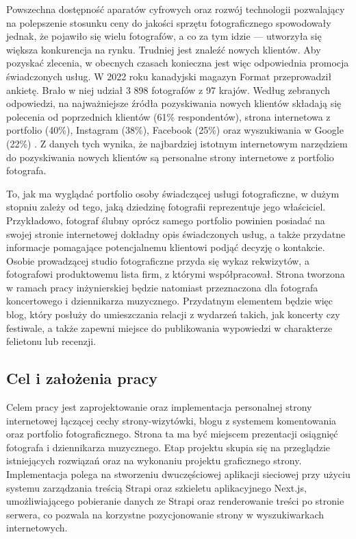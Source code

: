 \documentclass[a4paper, 12pt, twoside]{article}
\numberwithin{figure}{section}
\begin{document}
\begin{sloppypar}
Powszechna dostępność aparatów cyfrowych oraz rozwój technologii pozwalający na polepszenie stosunku ceny do jakości sprzętu fotograficznego spowodowały jednak, że pojawiło się wielu fotografów, a co za tym idzie --- utworzyła się większa konkurencja na rynku. Trudniej jest znaleźć nowych klientów. Aby pozyskać zlecenia, w obecnych czasach konieczna jest więc odpowiednia promocja świadczonych usług. W 2022 roku kanadyjski magazyn Format przeprowadził ankietę. Brało w niej udział 3 898 fotografów z 97 krajów. Według zebranych odpowiedzi, na najważniejsze źródła pozyskiwania nowych klientów składają się polecenia od poprzednich klientów (61\% respondentów), strona internetowa z portfolio (40\%), Instagram (38\%), Facebook (25\%) oraz wyszukiwania w Google (22\%) \cite{stateofphotography}. Z danych tych wynika, że najbardziej istotnym internetowym narzędziem do pozyskiwania nowych klientów są personalne strony internetowe z portfolio fotografa.

To, jak ma wyglądać portfolio osoby świadczącej usługi fotograficzne, w dużym stopniu zależy od tego, jaką dziedzinę fotografii reprezentuje jego właściciel. Przykładowo, fotograf ślubny oprócz samego portfolio powinien posiadać na swojej stronie internetowej dokładny opis świadczonych usług, a także przydatne informacje pomagające potencjalnemu klientowi podjąć decyzję o kontakcie. Osobie prowadzącej studio fotograficzne przyda się wykaz rekwizytów, a fotografowi produktowemu lista firm, z którymi współpracował. Strona tworzona w ramach pracy inżynierskiej będzie natomiast przeznaczona dla fotografa koncertowego i dziennikarza muzycznego. Przydatnym elementem będzie więc blog, który posłuży do umieszczania relacji z wydarzeń takich, jak koncerty czy festiwale, a także zapewni miejsce do publikowania wypowiedzi w charakterze felietonu lub recenzji.



\subsection{Cel i założenia pracy}

Celem pracy jest zaprojektowanie oraz implementacja personalnej strony internetowej łączącej cechy strony-wizytówki, blogu z systemem komentowania oraz portfolio fotograficznego. Strona ta ma być miejscem prezentacji osiągnięć fotografa i dziennikarza muzycznego. Etap projektu skupia się na przeglądzie istniejących rozwiązań oraz na wykonaniu projektu graficznego strony. Implementacja polega na stworzeniu dwuczęściowej aplikacji sieciowej przy użyciu systemu zarządzania treścią Strapi oraz szkieletu aplikacyjnego Next.js, umożliwiającego pobieranie danych ze Strapi oraz renderowanie treści po stronie serwera, co pozwala na korzystne pozycjonowanie strony w wyszukiwarkach internetowych. 


\end{sloppypar}
\end{document}

